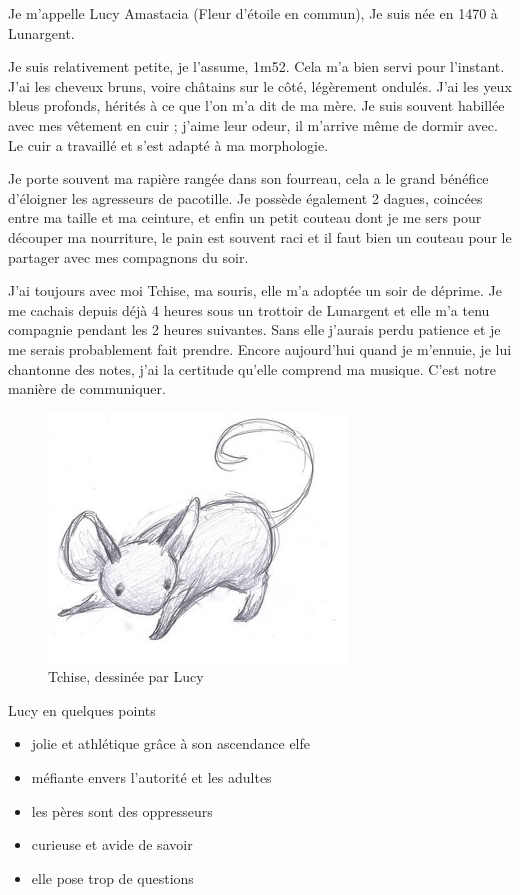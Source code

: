 \documentclass[10pt,a4paper,twoside,twocolumn,openany]{book}
\begin{document}
Je m'appelle Lucy Amastacia (Fleur d'étoile en commun), Je suis née en 1470 à Lunargent.

Je suis relativement petite, je l'assume, 1m52. Cela m'a bien servi
pour l'instant. J'ai les cheveux bruns, voire châtains sur le côté, légèrement
ondulés. J'ai les yeux bleus profonds, hérités à ce que l'on m'a dit de ma mère.
Je suis souvent habillée avec mes vêtement en cuir ; j'aime leur odeur, il m'arrive
même de dormir avec. Le cuir a travaillé et s'est adapté à ma morphologie.

Je porte souvent ma rapière rangée dans son fourreau, cela a le grand bénéfice d'éloigner
les agresseurs de pacotille. Je possède également 2 dagues, coincées
entre ma taille et ma ceinture, et enfin un petit couteau dont je me sers pour
découper ma nourriture, le pain est souvent raci et il faut bien un couteau pour le partager
avec mes compagnons du soir.

J'ai toujours avec moi Tchise, ma souris, elle m'a adoptée un soir de déprime. Je me cachais
depuis déjà 4 heures sous un trottoir de Lunargent et elle m'a tenu compagnie pendant
les 2 heures suivantes. Sans elle j'aurais perdu patience et je me serais probablement
fait prendre. Encore aujourd'hui quand je m'ennuie, je lui chantonne des notes, j'ai la
certitude qu'elle comprend ma musique. C'est notre manière de communiquer.

\begin{figure}[!h]
\centering
\includegraphics[scale=1]{tchise.png}
\caption*{Tchise, dessinée par Lucy}
\end{figure}

\begin{commentbox}{Lucy en quelques points}

\begin{itemize}
\item jolie et athlétique grâce à son ascendance elfe
\item méfiante envers l'autorité et les adultes
\item les pères sont des oppresseurs
\item curieuse et avide de savoir
\item elle pose trop de questions
\end{itemize}

\end{commentbox}
\end{document}
